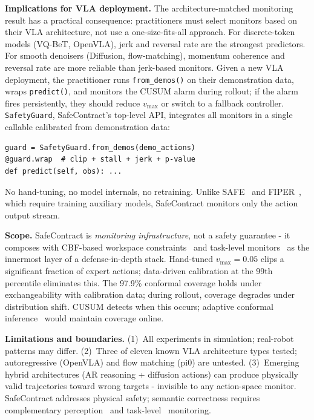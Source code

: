 \documentclass[conference]{IEEEtran}
\begin{document}
\textbf{Implications for VLA deployment.}
The architecture-matched monitoring result has a practical consequence: practitioners must select monitors based on their VLA architecture, not use a one-size-fits-all approach.
For discrete-token models (VQ-BeT, OpenVLA), jerk and reversal rate are the strongest predictors.
For smooth denoisers (Diffusion, flow-matching), momentum coherence and reversal rate are more reliable than jerk-based monitors.
Given a new VLA deployment, the practitioner runs \texttt{from\_demos()} on their demonstration data, wraps \texttt{predict()}, and monitors the CUSUM alarm during rollout; if the alarm fires persistently, they should reduce $v_{\max}$ or switch to a fallback controller.
\texttt{SafetyGuard}, SafeContract's top-level API, integrates all monitors in a single callable calibrated from demonstration data:

{\small
\begin{verbatim}
guard = SafetyGuard.from_demos(demo_actions)
@guard.wrap  # clip + stall + jerk + p-value
def predict(self, obs): ...
\end{verbatim}
}
\vspace{-2mm}
\noindent No hand-tuning, no model internals, no retraining.
Unlike SAFE~\cite{safe2025} and FIPER~\cite{fiper2025}, which require training auxiliary models, SafeContract monitors only the action output stream.

\textbf{Scope.}
SafeContract is \emph{monitoring infrastructure}, not a safety guarantee - it composes with CBF-based workspace constraints~\cite{aegis} and task-level monitors~\cite{sentinel} as the innermost layer of a defense-in-depth stack.
Hand-tuned $v_{\max}{=}0.05$ clips a significant fraction of expert actions; data-driven calibration at the 99th percentile eliminates this.
The 97.9\% conformal coverage holds under exchangeability with calibration data; during rollout, coverage degrades under distribution shift. CUSUM detects when this occurs; adaptive conformal inference~\cite{gibbs2021} would maintain coverage online.

\textbf{Limitations and boundaries.}
(1)~All experiments in simulation; real-robot patterns may differ.
(2)~Three of eleven known VLA architecture types tested; autoregressive (OpenVLA) and flow matching (pi0) are untested.
(3)~Emerging hybrid architectures (AR reasoning + diffusion actions) can produce physically valid trajectories toward wrong targets - invisible to any action-space monitor. SafeContract addresses physical safety; semantic correctness requires complementary perception~\cite{fiper2025} and task-level~\cite{sentinel} monitoring.
\end{document}
